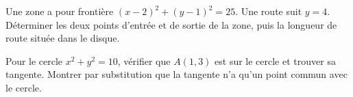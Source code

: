\documentclass[11pt,a4paper]{article}
\begin{document}
\par\noindent\begin{minipage}{\linewidth}
Une zone a pour frontière $(x-2)^2+(y-1)^2=25$. Une route suit $y=4$. Déterminer les deux points d’entrée et de sortie de la zone, puis la longueur de route située dans le disque.
\end{minipage}\par
\par\noindent\begin{minipage}{\linewidth}
Pour le cercle $x^2+y^2=10$, vérifier que $A(1,3)$ est sur le cercle et trouver sa tangente. Montrer par substitution que la tangente n’a qu’un point commun avec le cercle.
\end{minipage}\par
\end{document}
